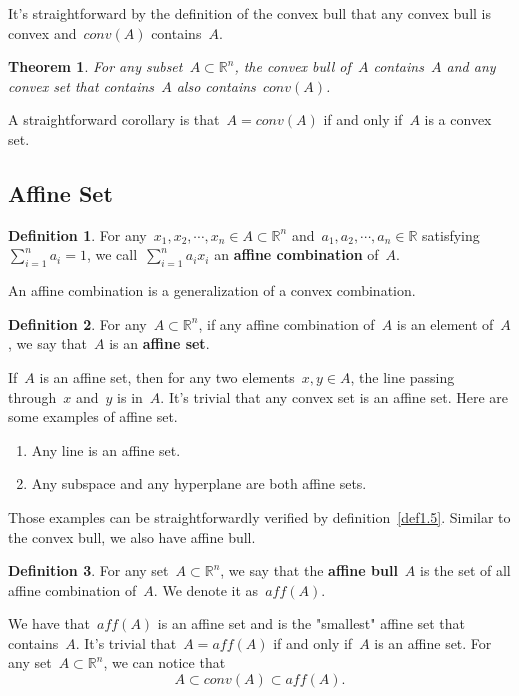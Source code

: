 \documentclass[12pt,a4paper,draft]{article}  %
\newtheorem{theorem}{Theorem}[section]
\theoremstyle{definition}
\newtheorem{definition}{Definition}[section]
\numberwithin{equation}{section}
\newcommand{\RR}{\mathbb{R}}
\begin{document}
It's straightforward by the definition of the convex bull that any convex bull is convex 
and~$conv(A)$ contains~$A$.

\begin{theorem}
    For any subset~$A \subset \RR^n$, the convex bull of~$A$ contains~$A$ and 
    any convex set that contains~$A$ also contains~$conv(A)$.
\end{theorem}
A straightforward corollary is that~$A=conv(A)$ if and only if~$A$ is a convex set.

\subsection{Affine Set}

\begin{definition}
    For any~$x_1,x_2,\cdots,x_n \in A \subset \RR^n$ and~$a_1,a_2,\cdots,a_n \in \RR$ 
    satisfying~$\sum_{i=1}^{n}a_i=1$, we call~$ \sum_{i=1}^{n}a_i x_i $
    an \textbf{affine combination} of~$A$.
\end{definition}

An affine combination is a generalization of a convex combination.

\begin{definition} \label{def1.5}
    For any~$A \subset \RR^n$, if any affine combination of~$A$ is an element of~$A$,
    we say that~$A$ is an \textbf{affine set}.
\end{definition}
If~$A$ is an affine set, then for any two elements~$x,y \in A$, the line passing 
through~$x$ and~$y$ is in~$A$.
It's trivial that any convex set is an affine set. Here are some examples of affine set.
\begin{enumerate}
    \item Any line is an affine set.
    \item Any subspace and any hyperplane are both affine sets.
\end{enumerate}
Those examples can be straightforwardly verified by definition~\eqref{def1.5}.
Similar to the convex bull, we also have affine bull.

\begin{definition}
    For any set~$A \subset \RR^n$, we say that the \textbf{affine bull}~$A$ is the set of all
    affine combination of~$A$. We denote it as~$aff(A)$.
\end{definition}

We have that~$aff(A)$ is an affine set and is the "smallest" affine set that
contains~$A$. It's trivial that~$A=aff(A)$ if and only if~$A$ is an affine set.
For any set~$A \subset \RR^n$, we can notice that
$$ A \subset conv(A) \subset aff(A). $$
\end{document}
